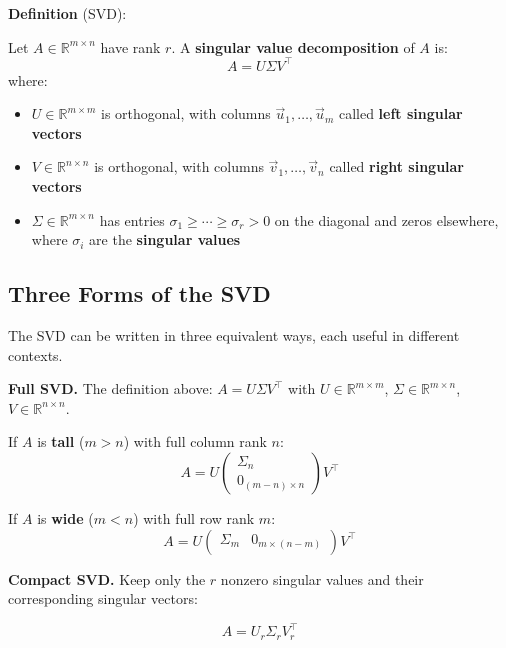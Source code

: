 \documentclass[10pt, twocolumn]{article}
\theoremstyle{definition}
\theoremstyle{plain}
\newcommand{\RR}{\mathbb{R}}
\begin{document}
\begin{tcolorbox}
\textbf{Definition} (SVD):

Let $A \in \RR^{m \times n}$ have rank $r$. A \textbf{singular value decomposition} of $A$ is:
\[
    A = U \Sigma V^\top
\]
where:
\begin{itemize}
    \item $U \in \RR^{m \times m}$ is orthogonal, with columns $\vec{u}_1, \ldots, \vec{u}_m$ called \textbf{left singular vectors}
    \item $V \in \RR^{n \times n}$ is orthogonal, with columns $\vec{v}_1, \ldots, \vec{v}_n$ called \textbf{right singular vectors}
    \item $\Sigma \in \RR^{m \times n}$ has entries $\sigma_1 \ge \cdots \ge \sigma_r > 0$ on the diagonal and zeros elsewhere, where $\sigma_i$ are the \textbf{singular values}
\end{itemize}
\end{tcolorbox}

\subsection{Three Forms of the SVD}

The SVD can be written in three equivalent ways, each useful in different contexts.

\textbf{Full SVD.} The definition above: $A = U\Sigma V^\top$ with $U \in \RR^{m \times m}$, $\Sigma \in \RR^{m \times n}$, $V \in \RR^{n \times n}$.

If $A$ is \textbf{tall} ($m > n$) with full column rank $n$:
\[
    A = U \begin{pmatrix} \Sigma_n \\ 0_{(m-n) \times n} \end{pmatrix} V^\top
\]

If $A$ is \textbf{wide} ($m < n$) with full row rank $m$:
\[
    A = U \begin{pmatrix} \Sigma_m & 0_{m \times (n-m)} \end{pmatrix} V^\top
\]

\textbf{Compact SVD.} Keep only the $r$ nonzero singular values and their corresponding singular vectors:

\begin{result}
\[
    A = U_r \Sigma_r V_r^\top
\]
\end{result}
\end{document}
